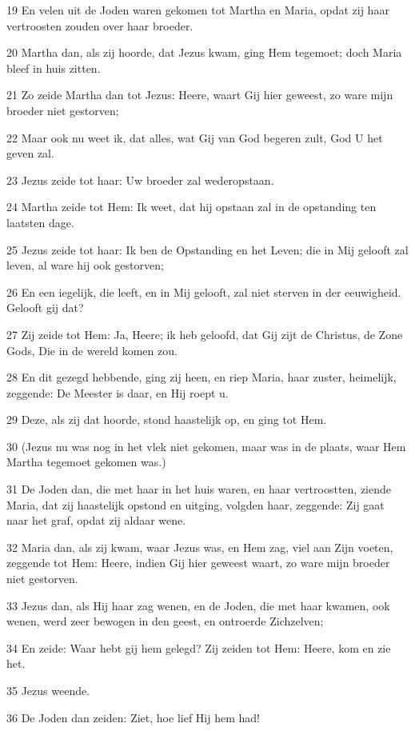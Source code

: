 \par 19 En velen uit de Joden waren gekomen tot Martha en Maria, opdat zij haar vertroosten zouden over haar broeder.
\par 20 Martha dan, als zij hoorde, dat Jezus kwam, ging Hem tegemoet; doch Maria bleef in huis zitten.
\par 21 Zo zeide Martha dan tot Jezus: Heere, waart Gij hier geweest, zo ware mijn broeder niet gestorven;
\par 22 Maar ook nu weet ik, dat alles, wat Gij van God begeren zult, God U het geven zal.
\par 23 Jezus zeide tot haar: Uw broeder zal wederopstaan.
\par 24 Martha zeide tot Hem: Ik weet, dat hij opstaan zal in de opstanding ten laatsten dage.
\par 25 Jezus zeide tot haar: Ik ben de Opstanding en het Leven; die in Mij gelooft zal leven, al ware hij ook gestorven;
\par 26 En een iegelijk, die leeft, en in Mij gelooft, zal niet sterven in der eeuwigheid. Gelooft gij dat?
\par 27 Zij zeide tot Hem: Ja, Heere; ik heb geloofd, dat Gij zijt de Christus, de Zone Gods, Die in de wereld komen zou.
\par 28 En dit gezegd hebbende, ging zij heen, en riep Maria, haar zuster, heimelijk, zeggende: De Meester is daar, en Hij roept u.
\par 29 Deze, als zij dat hoorde, stond haastelijk op, en ging tot Hem.
\par 30 (Jezus nu was nog in het vlek niet gekomen, maar was in de plaats, waar Hem Martha tegemoet gekomen was.)
\par 31 De Joden dan, die met haar in het huis waren, en haar vertroostten, ziende Maria, dat zij haastelijk opstond en uitging, volgden haar, zeggende: Zij gaat naar het graf, opdat zij aldaar wene.
\par 32 Maria dan, als zij kwam, waar Jezus was, en Hem zag, viel aan Zijn voeten, zeggende tot Hem: Heere, indien Gij hier geweest waart, zo ware mijn broeder niet gestorven.
\par 33 Jezus dan, als Hij haar zag wenen, en de Joden, die met haar kwamen, ook wenen, werd zeer bewogen in den geest, en ontroerde Zichzelven;
\par 34 En zeide: Waar hebt gij hem gelegd? Zij zeiden tot Hem: Heere, kom en zie het.
\par 35 Jezus weende.
\par 36 De Joden dan zeiden: Ziet, hoe lief Hij hem had!

